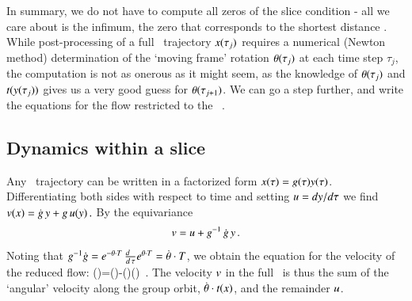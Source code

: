 \documentclass[preprint,12pt]{elsarticle} %
\begin{document}
In summary, we do not have to compute all zeros of the slice condition
 - all we care about is the infimum, the zero that
corresponds to the shortest distance .
While post-processing of a full \statesp\ trajectory $x(\tau_j)$
requires a numerical (Newton method) determination of the
`moving frame' rotation
${\bf \theta}(\tau_j)$ at each time step $\tau_j$, the computation is not
as onerous as it might seem, as the knowledge of ${\bf \theta}(\tau_j)$ and
$t(y(\tau_j))$
gives us a very good guess for ${\bf \theta}(\tau_{j+1})$. We
can go a step further, and write the equations for the flow restricted to
the \reducedsp\ \pSRed.

\subsection{Dynamics within a slice}
\label{sec:mslices}

Any \statesp\ trajectory can be written in a factorized
form $x(\tau)=g(\tau)
y(\tau)$. Differentiating both sides with respect to time and
setting $u={dy}/{d\tau}$ we find
\(
v(x)=\dot{g} \, y+g \, u(y)
\,.
\)
By the equivariance 
\[
v=u + g^{-1} \, \dot{g} \, y
\,.
\]
Noting that $g^{-1}\dot{g}=e^{-{\bf \theta} \cdot T} \,
\frac{d ~~}{d \, \tau} e^{{\bf \theta} \cdot T}=\dot{{\bf \theta}}\cdot T$,
we obtain the equation for the velocity of the reduced flow:
\beq
\velRed(\sspRed)=\vel(\sspRed)-\dot{\gSpace}(\sspRed)\cdot \groupTan(\sspRed)
\,.
The velocity $v$ in the full \statesp\ is thus the sum of the
`angular' velocity  along the group orbit,
$\dot{{\bf \theta}} \cdot t(x)$, and the remainder $u$.
\end{document}
